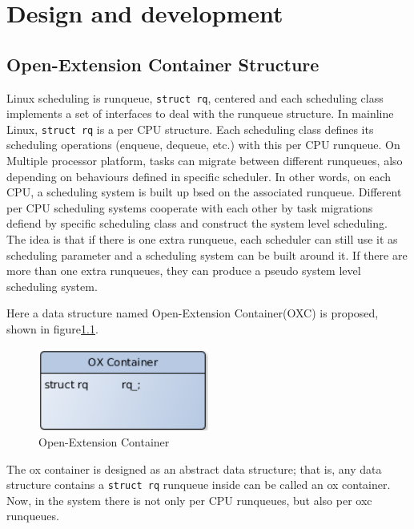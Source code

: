 \chapter{Design and development\label{chap:design}}

\section{Open-Extension Container Structure\label{sec:design_oxc}}


Linux scheduling is runqueue, \texttt{struct rq}, centered and each 
scheduling class 
implements a set of interfaces to deal with the runqueue structure.
In mainline Linux, \texttt{struct rq} is a per CPU structure.
Each scheduling class defines its scheduling operations (enqueue, 
dequeue, etc.) with this per CPU runqueue. On Multiple processor
platform, tasks can migrate between different runqueues, also depending
on behaviours defined in specific scheduler.
In other words, on each CPU, a scheduling system is built up bsed on the
associated runqueue.
Different per CPU scheduling systems cooperate
with each other by task migrations defiend by specific scheduling class 
and construct the system level scheduling. 
The idea is that if there is one extra runqueue, each scheduler can still 
use it as scheduling parameter and a scheduling system can be built around 
it. If there are more than one extra runqueues, they can produce a pseudo 
system level scheduling system.   

Here a data structure named Open-Extension Container(OXC) is proposed,
shown in figure\ref{fig:oxc}.
\begin{figure}[htbp]
        \centering
        \includegraphics[width=0.5\textwidth]{images/oxc}
        \caption{Open-Extension Container}
        \label{fig:oxc}
\end{figure}
The ox container is designed as an abstract data structure; that is, any data
structure contains a \texttt{struct rq} runqueue inside can be called an ox
container. Now, in the system there is not only per CPU runqueues, but also 
per oxc runqueues.

